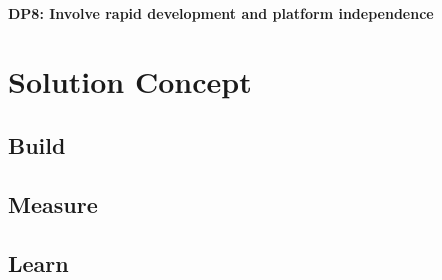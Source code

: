 \paragraph{DP8: Involve rapid development and platform independence}

\clearpage
\section{Solution Concept}
\label{design:section:solutionconcept}

\subsection{Build}
\label{design:section:build}

\subsection{Measure}
\label{design:section:measure}
\subsection{Learn}
\label{design:section:learn}